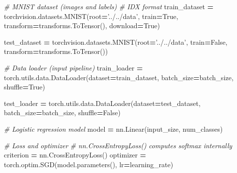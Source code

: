 \documentclass[]{book}
\newenvironment{Shaded}{\begin{snugshade}}{\end{snugshade}}
\newcommand{\CommentTok}[1]{\textcolor[rgb]{0.56,0.35,0.01}{\textit{#1}}}
\newcommand{\NormalTok}[1]{#1}
\newcommand{\OperatorTok}[1]{\textcolor[rgb]{0.81,0.36,0.00}{\textbf{#1}}}
\newcommand{\StringTok}[1]{\textcolor[rgb]{0.31,0.60,0.02}{#1}}
\newcommand{\VariableTok}[1]{\textcolor[rgb]{0.00,0.00,0.00}{#1}}
\begin{document}
\begin{Shaded}
\begin{Highlighting}[]
\CommentTok{# MNIST dataset (images and labels)}
\CommentTok{# IDX format}
\NormalTok{train_dataset }\OperatorTok{=}\NormalTok{ torchvision.datasets.MNIST(root}\OperatorTok{=}\StringTok{'../../data'}\NormalTok{, }
\NormalTok{                                           train}\OperatorTok{=}\VariableTok{True}\NormalTok{, }
\NormalTok{                                           transform}\OperatorTok{=}\NormalTok{transforms.ToTensor(),}
\NormalTok{                                           download}\OperatorTok{=}\VariableTok{True}\NormalTok{)}

\NormalTok{test_dataset }\OperatorTok{=}\NormalTok{ torchvision.datasets.MNIST(root}\OperatorTok{=}\StringTok{'../../data'}\NormalTok{, }
\NormalTok{                                          train}\OperatorTok{=}\VariableTok{False}\NormalTok{, }
\NormalTok{                                          transform}\OperatorTok{=}\NormalTok{transforms.ToTensor())}

\CommentTok{# Data loader (input pipeline)}
\NormalTok{train_loader }\OperatorTok{=}\NormalTok{ torch.utils.data.DataLoader(dataset}\OperatorTok{=}\NormalTok{train_dataset, }
\NormalTok{                                           batch_size}\OperatorTok{=}\NormalTok{batch_size, }
\NormalTok{                                           shuffle}\OperatorTok{=}\VariableTok{True}\NormalTok{)}

\NormalTok{test_loader }\OperatorTok{=}\NormalTok{ torch.utils.data.DataLoader(dataset}\OperatorTok{=}\NormalTok{test_dataset, }
\NormalTok{                                          batch_size}\OperatorTok{=}\NormalTok{batch_size, }
\NormalTok{                                          shuffle}\OperatorTok{=}\VariableTok{False}\NormalTok{)}
\end{Highlighting}
\end{Shaded}

\begin{Shaded}
\begin{Highlighting}[]
\CommentTok{# Logistic regression model}
\NormalTok{model }\OperatorTok{=}\NormalTok{ nn.Linear(input_size, num_classes)}

\CommentTok{# Loss and optimizer}
\CommentTok{# nn.CrossEntropyLoss() computes softmax internally}
\NormalTok{criterion }\OperatorTok{=}\NormalTok{ nn.CrossEntropyLoss()  }
\NormalTok{optimizer }\OperatorTok{=}\NormalTok{ torch.optim.SGD(model.parameters(), lr}\OperatorTok{=}\NormalTok{learning_rate)  }
\end{Highlighting}
\end{Shaded}
\end{document}
